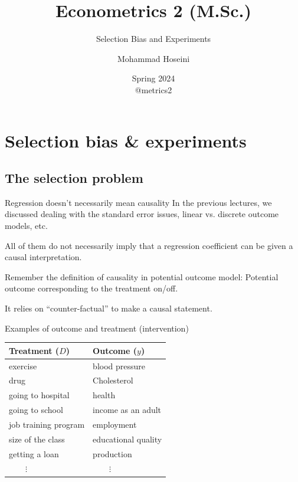 \documentclass{beamer}
\begin{document}
	\title[Econometrics 2]{Econometrics 2 (M.Sc.)}
	\subtitle{Selection Bias and Experiments}
	\author[Mohammad Hoseini]{Mohammad Hoseini}
	
	
	\date[Spring 2024]{Spring 2024 \\
	\vspace{10pt} @metrics2
}
	
\begin{frame}[plain]
	\titlepage
\end{frame}


\section{Selection bias \& experiments}



\subsection{The selection problem}

\begin{frame}{Regression doesn't necessarily mean causality}
In the previous lectures, we discussed dealing with the standard error issues, linear vs. discrete outcome models, etc.\bigskip

All of them do not necessarily imply that a regression coefficient can be given a causal interpretation.\bigskip

Remember the definition of causality in potential outcome model: 
Potential outcome corresponding to the treatment on/off.\medskip

It relies on ``counter-factual'' to make a causal statement.\medskip

\end{frame}

\begin{frame}{Examples of outcome and treatment (intervention)}
\begin{center}
\begin{tabular}{l|l}
	Treatment ($D$) & Outcome ($y$) \\
	\hline
	
	exercise & blood pressure\\
	drug & Cholesterol\\
	going to hospital & health \\
	going to school & income as an adult  \\
	job training program & employment  \\
	size of the class & educational quality \\
	getting a loan & production  \\
	$\qquad\vdots$ &	$\qquad\vdots$ \\
\end{tabular}
\end{center}

\end{frame}
\end{document}
